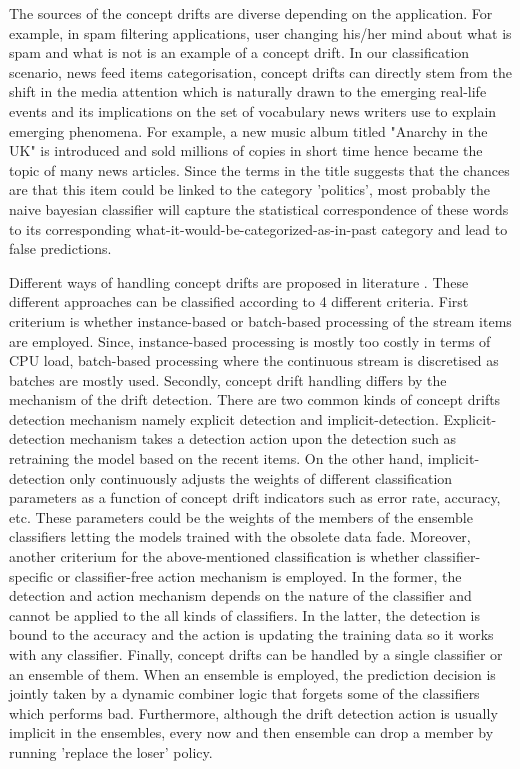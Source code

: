 \documentclass[12pt]{article}
\begin{document}
The sources of the concept drifts are diverse depending on the application. For example, in spam filtering applications, user changing his/her mind about what is spam and what is not is an example of a concept drift. In our classification scenario, news feed items categorisation, concept drifts can directly stem from the shift in the media attention which is naturally drawn to the emerging real-life events and its implications on the set of vocabulary news writers use to explain emerging phenomena. For example, a new music album titled  "Anarchy in the UK"  is introduced and sold millions of copies in short time hence became the topic of many news articles. Since the terms in the title suggests that the chances are that this item could be linked to the category 'politics', most probably the naive bayesian classifier will capture the statistical correspondence of these words to its corresponding what-it-would-be-categorized-as-in-past category and lead to false predictions.

Different ways of handling concept drifts are proposed in literature \citep[p. 5]{KunchevaEnsembleOverview08}. These different approaches can be classified according to 4 different criteria. First criterium is whether instance-based or batch-based processing of the stream items are employed. Since, instance-based processing is mostly too costly in terms of CPU load, batch-based processing where the continuous stream is discretised as batches are mostly used. Secondly, concept drift handling differs by the mechanism of the drift detection. There are two common kinds of concept drifts detection mechanism namely explicit detection and implicit-detection. Explicit-detection mechanism takes a detection action upon the detection such as retraining the model based on the recent items. On the other hand, implicit-detection only continuously adjusts the weights of different classification parameters as a function of concept drift indicators such as error rate, accuracy, etc. These parameters could be the weights of the members of the ensemble classifiers letting the models trained with the obsolete data fade. Moreover, another criterium for the above-mentioned classification is whether classifier-specific or classifier-free action mechanism is employed. In the former, the detection and action mechanism depends on the nature of the classifier and cannot be applied to the all kinds of classifiers. In the latter, the detection is bound to the accuracy and the action is updating the training data so it works with any classifier. Finally, concept drifts can be handled by a single classifier or an ensemble of them. When an ensemble is employed, the prediction decision is jointly taken by a dynamic combiner logic that forgets some of the classifiers which performs bad. Furthermore, although the drift detection action is usually implicit in the ensembles, every now and then ensemble can drop a member by running 'replace the loser' policy.
\end{document}
